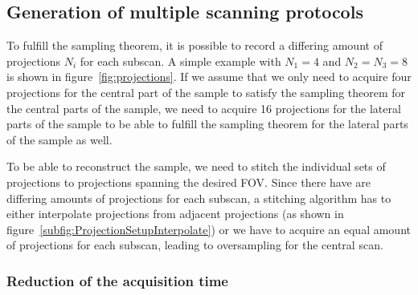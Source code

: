 \subsection{Generation of multiple scanning protocols}

\cbstart
To fulfill the sampling theorem, it is possible to record a differing amount of projections $N_{i}$ for each subscan. A simple example with $N_{1}=4$ and $N_{2}=N_{3}=8$ is shown in figure~\ref{fig:projections}. If we assume that we only need to acquire four projections for the central part of the sample to satisfy the sampling theorem for the central parts of the sample, we need to acquire 16 projections for the lateral parts of the sample to be able to fulfill the sampling theorem for the lateral parts of the sample as well.

To be able to reconstruct the sample, we need to stitch the individual sets of projections to projections spanning the desired FOV. Since there have are differing amounts of projections for each subscan, a stitching algorithm has to either interpolate projections from adjacent projections (as shown in figure~\ref{subfig:ProjectionSetupInterpolate}) or we have to acquire an equal amount of projections for each subscan, leading to oversampling for the central scan.

\begin{figure*}[htp]
	\centering
	\subfloat[]{%
		\label{subfig:ProjectionSetup}%
		}%
	\subfloat[]{%
		\label{subfig:ProjectionSetupInterpolate}%
		}%
	\caption{Setup with one central (green) and two lateral scans (red and blue, respectively). For demonstration purposes, the central scan has four projections and the lateral scans have eight projections each (all acquired over \SI{180}{\degree}). The colors of the three positions correspond to the colors shown in figure~\ref{subfig:scanning-possibilities}. : scanned projections, : scanned projections and additional interpolated projections (dashed) needed to correctly merge all projections.}
	\label{fig:projections}
\end{figure*}
\cbend

\subsubsection{Reduction of the acquisition time}

